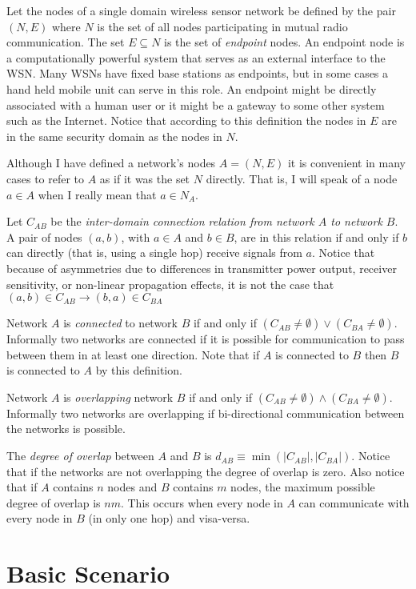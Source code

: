 \documentclass{article}
\begin{document}
Let the nodes of a single domain wireless sensor network be defined by the pair $(N, E)$ where
$N$ is the set of all nodes participating in mutual radio communication. The set $E \subseteq N$
is the set of \emph{endpoint} nodes. An endpoint node is a computationally powerful system that
serves as an external interface to the WSN. Many WSNs have fixed base stations as endpoints, but
in some cases a hand held mobile unit can serve in this role. An endpoint might be directly
associated with a human user or it might be a gateway to some other system such as the Internet.
Notice that according to this definition the nodes in $E$ are in the same security domain as the
nodes in $N$.

Although I have defined a network's nodes $A = (N, E)$ it is convenient in many cases to refer
to $A$ as if it was the set $N$ directly. That is, I will speak of a node $a \in A$ when I
really mean that $a \in N_A$.

Let $C_{AB}$ be the \emph{inter-domain connection relation from network $A$ to network $B$}. A
pair of nodes $(a, b)$, with $a \in A$ and $b \in B$, are in this relation if and only if $b$
can directly (that is, using a single hop) receive signals from $a$. Notice that because of
asymmetries due to differences in transmitter power output, receiver sensitivity, or non-linear
propagation effects, it is not the case that $(a, b) \in C_{AB} \rightarrow (b, a) \in C_{BA}$

Network $A$ is \emph{connected} to network $B$ if and only if $(C_{AB} \ne \emptyset) \vee
(C_{BA} \ne \emptyset)$. Informally two networks are connected if it is possible for
communication to pass between them in at least one direction. Note that if $A$ is connected to
$B$ then $B$ is connected to $A$ by this definition.

Network $A$ is \emph{overlapping} network $B$ if and only if $(C_{AB} \ne \emptyset) \wedge
(C_{BA} \ne \emptyset)$. Informally two networks are overlapping if bi-directional communication
between the networks is possible.

The \emph{degree of overlap} between $A$ and $B$ is $d_{AB} \equiv \min(|C_{AB}|, |C_{BA}|)$.
Notice that if the networks are not overlapping the degree of overlap is zero. Also notice that
if $A$ contains $n$ nodes and $B$ contains $m$ nodes, the maximum possible degree of overlap is
$nm$. This occurs when every node in $A$ can communicate with every node in $B$ (in only one
hop) and visa-versa.

\section{Basic Scenario}
\end{document}
